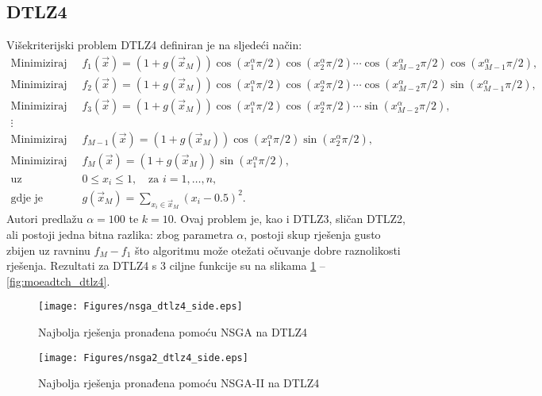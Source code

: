 \documentclass[times, utf8, zavrsni, numeric]{fer}
\begin{document}
\subsection{DTLZ4}
Višekriterijski problem DTLZ4 definiran je na sljedeći način:
\begin{align*}
\mbox{Minimiziraj }\: &f_1(\vec{x}) = (1 + g(\vec{x}_M))\cos{(x_1^{\alpha}\pi/2)}\cos{(x_2^{\alpha}\pi/2)}\cdots\cos{(x_{M - 2}^{\alpha}\pi/2)}\cos{(x_{M - 1}^{\alpha}\pi/2)},\\
\mbox{Minimiziraj }\: &f_2(\vec{x}) = (1 + g(\vec{x}_M))\cos{(x_1^{\alpha}\pi/2)}\cos{(x_2^{\alpha}\pi/2)}\cdots\cos{(x_{M - 2}^{\alpha}\pi/2)}\sin{(x_{M - 1}^{\alpha}\pi/2)},\\
\mbox{Minimiziraj }\: &f_3(\vec{x}) = (1 + g(\vec{x}_M))\cos{(x_1^{\alpha}\pi/2)}\cos{(x_2^{\alpha}\pi/2)}\cdots\sin{(x_{M - 2}^{\alpha}\pi/2)},\\
\vdots\\
\mbox{Minimiziraj }\: &f_{M-1}(\vec{x}) = (1 + g(\vec{x}_M))\cos{(x_1^{\alpha}\pi/2)}\sin{(x_2^{\alpha}\pi/2)},\\
\mbox{Minimiziraj }\: &f_{M}(\vec{x}) = (1 + g(\vec{x}_M))\sin{(x_1^{\alpha}\pi/2)},\\
\mbox{uz ograničenja }\: &0 \leq x_i \leq 1, \quad \text{za } i = 1,\dots, n,\\
\mbox{gdje je }\: &g(\vec{x}_M) = \sum_{x_i \in \vec{x}_M}{(x_i - 0.5)^2}.
\end{align*}
Autori predlažu $\alpha = 100$ te $k = 10$. Ovaj problem je, kao i DTLZ3, sličan DTLZ2, ali postoji jedna bitna razlika: zbog parametra $\alpha$, postoji skup rješenja gusto zbijen uz ravninu $f_M-f_1$ što algoritmu može otežati očuvanje dobre raznolikosti rješenja. Rezultati za DTLZ4 s 3 ciljne funkcije su na slikama \ref{fig:nsga_dtlz4} -- \ref{fig:moeadtch_dtlz4}.\\

\begin{figure}[htb]
\centering
\texttt{[image: Figures/nsga\_dtlz4\_side.eps]}
\caption{Najbolja rješenja pronađena pomoću NSGA na DTLZ4}
\label{fig:nsga_dtlz4}
\end{figure}

\begin{figure}[htb]
\centering
\texttt{[image: Figures/nsga2\_dtlz4\_side.eps]}
\caption{Najbolja rješenja pronađena pomoću NSGA-II na DTLZ4}
\label{fig:nsgaii_dtlz4}
\end{figure}
\end{document}
